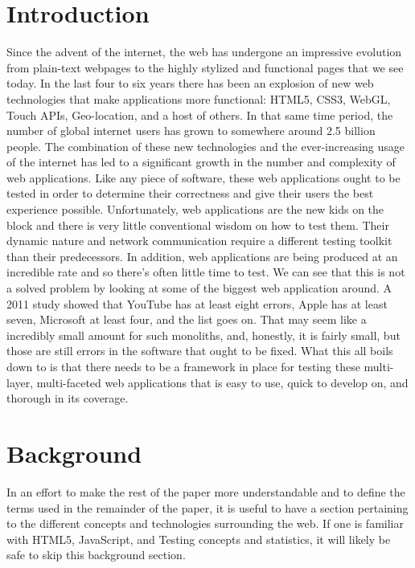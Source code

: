 \documentclass[11pt]{article}
\begin{document}
\section{Introduction}
Since the advent of the internet, the web has undergone an impressive evolution from plain-text webpages to the highly stylized and functional pages that we see today. In the last four to six years there has been an explosion of new web technologies that make applications more functional: HTML5, CSS3, WebGL, Touch APIs, Geo-location, and a host of others. \cite{EvolutionOfWeb} In that same time period, the number of global internet users has grown to somewhere around 2.5 billion people. \cite{EvolutionOfWeb} The combination of these new technologies and the ever-increasing usage of the internet has led to a significant growth in the number and complexity of web applications.
Like any piece of software, these web applications ought to be tested in order to determine their correctness and give their users the best experience possible. Unfortunately, web applications are the new kids on the block and there is very little conventional wisdom on how to test them. Their dynamic nature and network communication require a different testing toolkit than their predecessors. In addition, web applications are being produced at an incredible rate and so there's often little time to test.
We can see that this is not a solved problem by looking at some of the biggest web application around. A 2011 study showed that YouTube has at least eight errors, Apple has at least seven, Microsoft at least four, and the list goes on. \cite{ErrorsInTheWild} That may seem like a incredibly small amount for such monoliths, and, honestly, it is fairly small, but those are still errors in the software that ought to be fixed.
What this all boils down to is that there needs to be a framework in place for testing these multi-layer, multi-faceted web applications that is easy to use, quick to develop on, and thorough in its coverage. 

\section{Background}
In an effort to make the rest of the paper more understandable and to define the terms used in the remainder of the paper, it is useful to have a section pertaining to the different concepts and technologies surrounding the web.
If one is familiar with HTML5, JavaScript, and Testing concepts and statistics, it will likely be safe to skip this background section.
\end{document}
